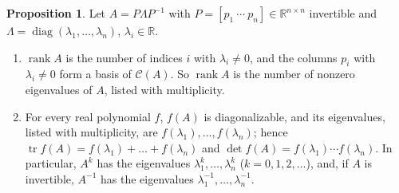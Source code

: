 \documentclass[12pt]{article}
\newcommand{\R}{\mathbb R}
\DeclareMathOperator{\tr}{tr}
\DeclareMathOperator{\diag}{diag}
\DeclareMathOperator{\rank}{rank}
\theoremstyle{definition}
\newtheorem{proposition}[theorem]{Proposition}
\begin{document}
\begin{proposition}\label{r7-prop-diag-rank}
Let \(A=P\Lambda P^{-1}\) with \(P=[p_1\ \cdots\ p_n]\in\R^{n\times n}\) invertible and
\(\Lambda=\diag(\lambda_1,\dots,\lambda_n)\), \(\lambda_i\in\R\).
\begin{enumerate}
\item \(\rank A\) is the number of indices \(i\) with \(\lambda_i\ne0\), and the columns \(p_i\) with \(\lambda_i\ne0\) form a
basis of \(\mathcal C(A)\). So \(\rank A\) is the number of nonzero eigenvalues of \(A\), listed with multiplicity.
\item For every real polynomial \(f\), \(f(A)\) is diagonalizable, and its eigenvalues, listed with multiplicity, are
\(f(\lambda_1),\dots,f(\lambda_n)\); hence \(\tr f(A)=f(\lambda_1)+\dots+f(\lambda_n)\) and
\(\det f(A)=f(\lambda_1)\cdots f(\lambda_n)\). In particular, \(A^k\) has the eigenvalues \(\lambda_1^k,\dots,\lambda_n^k\)
(\(k=0,1,2,\dots\)), and, if \(A\) is invertible, \(A^{-1}\) has the eigenvalues \(\lambda_1^{-1},\dots,\lambda_n^{-1}\).
\end{enumerate}
\end{proposition}
\end{document}
